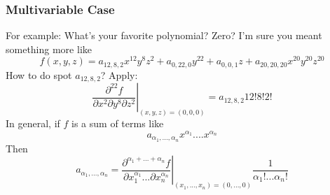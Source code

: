 \documentclass{article}
\begin{document}
\subsubsection{Multivariable Case}
For example: What's your favorite polynomial? Zero? I'm sure you meant something more like
\begin{equation}f(x, y, z) = a_{12,8,2}x^{12}y^8z^2 + a_{0,22,0}y^{22} + a_{0,0,1}z + a_{20,20,20}x^{20}y^{20}z^{20}\end{equation}
How to do spot \(a_{12, 8, 2}\)? Apply:
\begin{equation}\left.\frac{\partial^{22}f}{\partial x^2 \partial y^8 \partial z^2}\right|_{(x, y, z) = (0, 0, 0)} = a_{12, 8, 2}12!8!2!\end{equation}
In general, if \(f\) is a sum of terms like
\begin{equation}a_{\alpha_1,...,\alpha_n}x^{\alpha_1}....x^{\alpha_n}\end{equation}
Then
\begin{equation}a_{\alpha_1,...,\alpha_n} = \left.\frac{\partial^{\alpha_1 + ... + \alpha_n}f}{\partial x_1^{\alpha_1} ... \partial x_n^{\alpha_n}}\right|_{(x_1,...,x_n) = (0,...,0)}\frac{1}{\alpha_1!...\alpha_n!}\end{equation}
\end{document}
